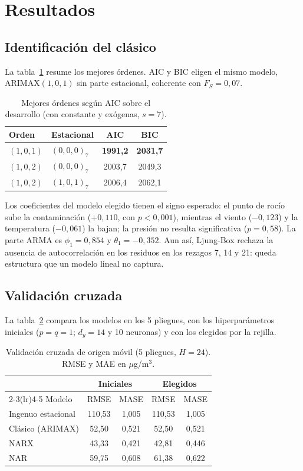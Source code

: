 \documentclass[11pt,letterpaper]{article}
\begin{document}
\section{Resultados}

\subsection{Identificación del clásico}

La tabla~\ref{tab:aic} resume los mejores órdenes. AIC y BIC eligen el mismo modelo, ARIMAX$(1,0,1)$ sin parte estacional, coherente con $F_S=0{,}07$.

\begin{table}[H]
\centering
\caption{Mejores órdenes según AIC sobre el desarrollo (con constante y exógenas, $s=7$).}\label{tab:aic}
\begin{tabular}{llcc}
\toprule
Orden & Estacional & AIC & BIC \\
\midrule
$(1,0,1)$ & $(0,0,0)_7$ & \textbf{1991,2} & \textbf{2031,7} \\
$(1,0,2)$ & $(0,0,0)_7$ & 2003,7 & 2049,3 \\
$(1,0,2)$ & $(1,0,1)_7$ & 2006,4 & 2062,1 \\
\bottomrule
\end{tabular}
\end{table}

Los coeficientes del modelo elegido tienen el signo esperado: el punto de rocío sube la contaminación ($+0{,}110$, con $p<0{,}001$), mientras el viento ($-0{,}123$) y la temperatura ($-0{,}061$) la bajan; la presión no resulta significativa ($p=0{,}58$). La parte ARMA es $\phi_1=0{,}854$ y $\theta_1=-0{,}352$. Aun así, Ljung-Box rechaza la ausencia de autocorrelación en los residuos en los rezagos 7, 14 y 21: queda estructura que un modelo lineal no captura.

\subsection{Validación cruzada}

La tabla~\ref{tab:cv} compara los modelos en los 5 pliegues, con los hiperparámetros iniciales ($p=q=1$; $d_y=14$ y 10 neuronas) y con los elegidos por la rejilla.

\begin{table}[H]
\centering
\caption{Validación cruzada de origen móvil (5 pliegues, $H=24$). RMSE y MAE en $\mu$g/m$^3$.}\label{tab:cv}
\begin{tabular}{lcccc}
\toprule
& \multicolumn{2}{c}{Iniciales} & \multicolumn{2}{c}{Elegidos} \\
\cmidrule(lr){2-3}\cmidrule(lr){4-5}
Modelo & RMSE & MASE & RMSE & MASE \\
\midrule
Ingenuo estacional & 110,53 & 1,005 & 110,53 & 1,005 \\
Clásico (ARIMAX) & 52,50 & 0,521 & 52,50 & 0,521 \\
NARX & 43,33 & 0,421 & 42,81 & 0,446 \\
NAR & 59,75 & 0,608 & 61,38 & 0,622 \\
\bottomrule
\end{tabular}
\end{table}
\end{document}
